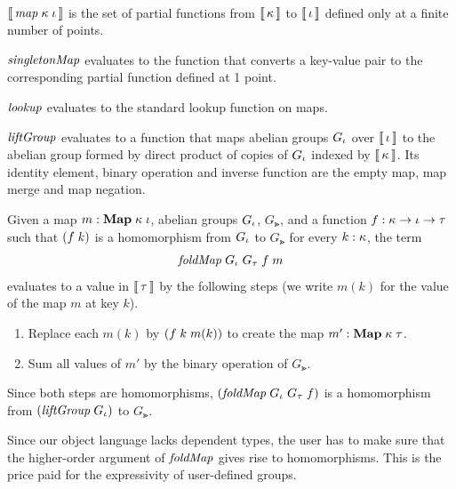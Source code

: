\begin{oldSec}
\begin{definition}~
\begin{subdefinition}
\item $\Eval{\MapT\Gk\Gi}$ is the set of partial functions from
$\Eval\Gk$ to $\Eval\Gi$ defined only at a finite number of
points.
\item $\mathit{singletonMap}$ evaluates to the function that converts a
key-value pair to the corresponding partial function defined at
1 point.
\item $\mathit{lookup}$ evaluates to the standard lookup function on
maps.
\item $\mathit{liftGroup}$ evaluates to a function that maps abelian
groups $G_\iota$ over $\Eval\Gi$ to the abelian group formed by
direct product of copies of $G_\iota$ indexed by $\Eval\Gk$. Its
identity element, binary operation and inverse function are the
empty map, map merge and map negation.
\item Given a map $\HasType m {\HashMap\Gk\Gi}$, abelian groups
$G_\iota$, $G_\Gt$, and a function $\HasType f
{\Fun\Gk{\Fun\Gi\Gt}}$ such that $\App*fk$ is a homomorphism from
$G_\iota$ to $G_\Gt$ for every $\HasType k\Gk$, the term
\[
\App{\App{\App{\App\FOLDMAP{G_\Gi}}{G_\Gt}}f}m
\]
evaluates to a value in $\Eval\Gt$ by the following steps (we
write $m(k)$ for the value of the map $m$ at key $k$).
\begin{enumerate}
\item Replace each $m(k)$ by $\App*{\App fk}{m(k)}$ to create the
map $\HasType{m'}{\HashMap\Gk\Gt}$.
\item Sum all values of $m'$ by the binary operation of $G_\Gt$.
\end{enumerate}
Since both steps are homomorphisms,
$\App*{\App{\App\FOLDMAP{G_\Gi}}{G_\Gt}}f$ is a homomorphism
from $\App*\LIFTGROUP{G_\Gi}$ to $G_\Gt$.
%
\end{subdefinition}
\end{definition}

Since our object language lacks dependent types, the user has to
make sure that the higher-order argument of $\mathit{foldMap}$ gives
rise to homomorphisms. This is the price paid for the
expressivity of user-defined groups.

\end{oldSec}

